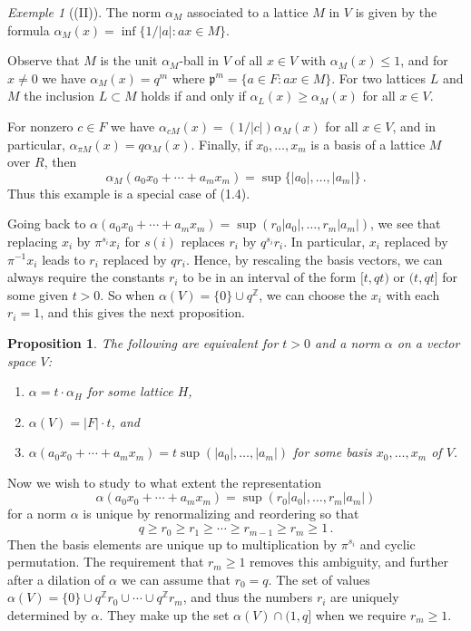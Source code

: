 \documentclass[12pt,a4paper]{article}
\theoremstyle{plain}
\newtheorem{proposition}{Proposition}[section]
\theoremstyle{definition}
\theoremstyle{remark}
\newtheorem{example}{Exemple}[section]
\begin{document}
\begin{example}[(II)]
The norm $\alpha_M$ associated to a lattice $M$ in $V$ is given by the formula 
$\alpha_M(x) = \inf\{1/|a| : ax \in M\}$.

Observe that $M$ is the unit $\alpha_M$-ball in $V$ of all $x \in V$ with 
$\alpha_M(x) \leqslant 1$, and for $x \neq 0$ we have $\alpha_M(x) = q^m$ where 
$\mathfrak{p}^m = \{a \in F : ax \in M\}$. For two lattices $L$ and $M$ the 
inclusion $L \subset M$ holds if and only if $\alpha_L(x) \geqslant \alpha_M(x)$ 
for all $x \in V$.

For nonzero $c \in F$ we have $\alpha_{cM}(x) = (1/|c|)\alpha_M(x)$ for all 
$x \in V$, and in particular, $\alpha_{\pi M}(x) = q\alpha_M(x)$. Finally, if 
$x_0, \ldots, x_m$ is a basis of a lattice $M$ over $R$, then
\[
\alpha_M(a_0 x_0 + \cdots + a_m x_m) = \sup\{|a_0|, \ldots, |a_m|\} \,.
\]
Thus this example is a special case of (1.4).
\end{example}

Going back to $\alpha(a_0 x_0 + \cdots + a_m x_m) = \sup(r_0|a_0|, \ldots, r_m|a_m|)$, 
we see that replacing $x_i$ by $\pi^{s_i}x_i$ for $s(i)$ replaces $r_i$ by 
$q^{s_i}r_i$. In particular, $x_i$ replaced by $\pi^{-1}x_i$ leads to $r_i$ 
replaced by $qr_i$. Hence, by rescaling the basis vectors, we can always 
require the constants $r_i$ to be in an interval of the form $[t, qt)$ or 
$(t, qt]$ for some given $t > 0$. So when $\alpha(V) = \{0\} \cup q^\mathbb{Z}$, 
we can choose the $x_i$ with each $r_i = 1$, and this gives the next 
proposition.

\begin{proposition}
The following are equivalent for $t > 0$ and a norm $\alpha$ on a vector 
space $V$:
\begin{enumerate}[label=(\arabic*)]
\item $\alpha = t \cdot \alpha_H$ for some lattice $H$,
\item $\alpha(V) = |F| \cdot t$, and
\item $\alpha(a_0 x_0 + \cdots + a_m x_m) = t\sup(|a_0|, \ldots, |a_m|)$ for some 
basis $x_0, \ldots, x_m$ of $V$.
\end{enumerate}
\end{proposition}

Now we wish to study to what extent the representation
\[
\alpha(a_0 x_0 + \cdots + a_m x_m) = \sup(r_0|a_0|, \ldots, r_m|a_m|)
\]
for a norm $\alpha$ is unique by renormalizing and reordering so that
\[
q \geqslant r_0 \geqslant r_1 \geqslant \cdots \geqslant r_{m-1} \geqslant r_m \geqslant 1 \,.
\]
Then the basis elements are unique up to multiplication by $\pi^{s_i}$ and 
cyclic permutation. The requirement that $r_m \geqslant 1$ removes this 
ambiguity, and further after a dilation of $\alpha$ we can assume that 
$r_0 = q$. The set of values $\alpha(V) = \{0\} \cup q^{\mathbb{Z}}r_0 \cup \cdots \cup q^{\mathbb{Z}}r_m$, 
and thus the numbers $r_i$ are uniquely determined by $\alpha$. They make up 
the set $\alpha(V) \cap (1,q]$ when we require $r_m \geqslant 1$.
\end{document}
